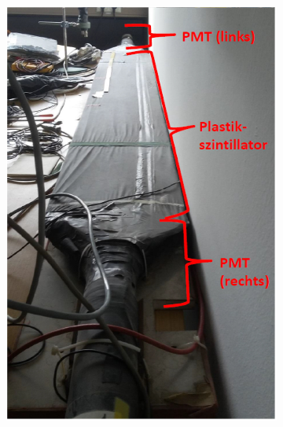 \documentclass[]{article}
\begin{document}
\begin{figure}[H]
\centering
\begin{subfigure}[h]{0.4\textwidth}
\includegraphics[width=1\textwidth]{Plots/Scintillator.jpg}
\end{subfigure}
\begin{subfigure}[h]{0.59\textwidth}

\end{subfigure}
\end{figure}
\end{document}
